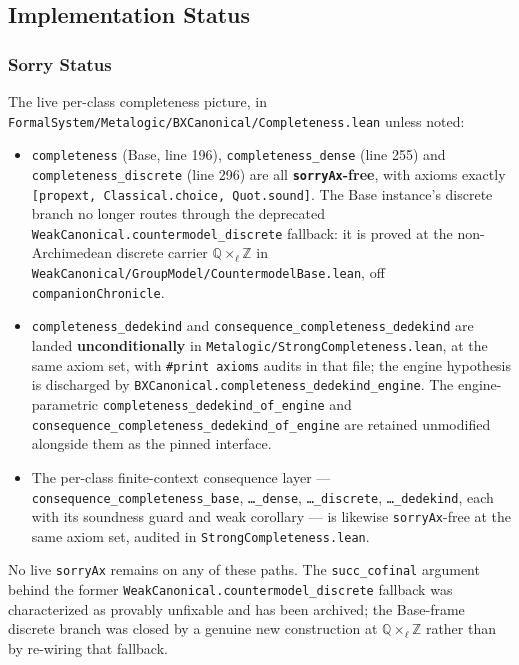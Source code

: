 \documentclass[../BimodalReference.tex]{subfiles}
\begin{document}
\subsection{Implementation Status}

\subsubsection{Sorry Status}

The live per-class completeness picture, in \texttt{FormalSystem/Metalogic/BXCanonical/Completeness.lean} unless noted:

\begin{itemize}
  \item \texttt{completeness} (Base, line 196), \texttt{completeness\_dense} (line 255) and \texttt{completeness\_discrete} (line 296) are all \textbf{\texttt{sorryAx}-free}, with axioms exactly \texttt{[propext, Classical.choice, Quot.sound]}. The Base instance's discrete branch no longer routes through the deprecated \texttt{WeakCanonical.countermodel\_discrete} fallback: it is proved at the non-Archimedean discrete carrier $\mathbb{Q} \times_{\ell} \mathbb{Z}$ in \texttt{WeakCanonical/GroupModel/CountermodelBase.lean}, off \texttt{companionChronicle}.
\item \texttt{completeness\_dedekind} and \texttt{consequence\_completeness\_dedekind} are landed \textbf{unconditionally} in \texttt{Metalogic/StrongCompleteness.lean}, at the same axiom set, with \texttt{\#print axioms} audits in that file; the engine hypothesis is discharged by \texttt{BXCanonical.completeness\_dedekind\_engine}. The engine-parametric \texttt{completeness\_dedekind\_of\_engine} and \texttt{consequence\_completeness\_dedekind\_of\_engine} are retained unmodified alongside them as the pinned interface.
\item The per-class finite-context consequence layer --- \texttt{consequence\_completeness\_base}, \texttt{\ldots\_dense}, \texttt{\ldots\_discrete}, \texttt{\ldots\_dedekind}, each with its soundness guard and weak corollary --- is likewise \texttt{sorryAx}-free at the same axiom set, audited in \texttt{StrongCompleteness.lean}.
\end{itemize}

\noindent
No live \texttt{sorryAx} remains on any of these paths. The \texttt{succ\_cofinal} argument behind the former \texttt{WeakCanonical.countermodel\_discrete} fallback was characterized as provably unfixable and has been archived; the Base-frame discrete branch was closed by a genuine new construction at $\mathbb{Q} \times_{\ell} \mathbb{Z}$ rather than by re-wiring that fallback.
\end{document}
